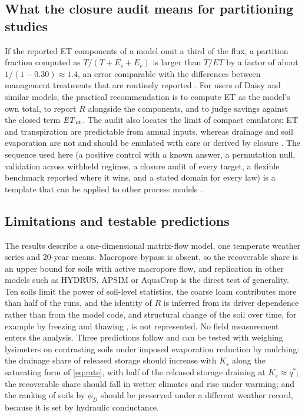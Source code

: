 \documentclass[review,12pt,authoryear]{elsarticle}
\begin{document}
\subsection{What the closure audit means for partitioning studies}
If the reported ET components of a model omit a third of the flux, a partition fraction computed as $T/(T+E_s+E_c)$ is larger than $T/\mathit{ET}$ by a factor of about $1/(1-0.30)\approx1.4$, an error comparable with the differences between management treatments that are routinely reported \citep{Jasechko2013,Schlesinger2014,Good2015,BalwinderSingh2011}. For users of Daisy and similar models, the practical recommendation is to compute ET as the model's own total, to report $R$ alongside the components, and to judge savings against the closed term $\mathit{ET}_{\mathrm{nt}}$. The audit also locates the limit of compact emulators: ET and transpiration are predictable from annual inputs, whereas drainage and soil evaporation are not and should be emulated with care or derived by closure \citep{Razavi2012,Asher2015}. The sequence used here (a positive control with a known answer, a permutation null, validation across withheld regimes, a closure audit of every target, a flexible benchmark reported where it wins, and a stated domain for every law) is a template that can be applied to other process models \citep{Roberts2017,Rudin2019,Bennett2013,Moriasi2007,Hutton2016}.

\subsection{Limitations and testable predictions}
The results describe a one-dimensional matrix-flow model, one temperate weather series and 20-year means. Macropore bypass \citep{Jarvis2007,Beven1982} is absent, so the recoverable share is an upper bound for soils with active macropore flow, and replication in other models such as HYDRUS, APSIM or AquaCrop \citep{Simunek2008,Simunek2016,Keating2003,Steduto2009,Vereecken2016} is the direct test of generality. Ten soils limit the power of soil-level statistics, the coarse loam contributes more than half of the runs, and the identity of $R$ is inferred from its driver dependence rather than from the model code, and structural change of the soil over time, for example by freezing and thawing \citep{Leuther2021,MirandaVelez2023}, is not represented. No field measurement enters the analysis. Three predictions follow and can be tested with weighing lysimeters on contrasting soils under imposed evaporation reduction by mulching: the drainage share of released storage should increase with $K_s$ along the saturating form of \cref{eq:rate}, with half of the released storage draining at $K_s\approx q^\ast$; the recoverable share should fall in wetter climates and rise under warming; and the ranking of soils by $\phi_D$ should be preserved under a different weather record, because it is set by hydraulic conductance.
\end{document}

